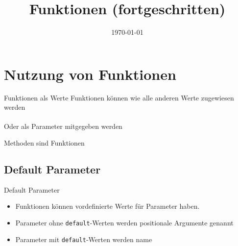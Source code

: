 

\newcommand{\topic}{
	Funktionen (fortgeschritten)
}

\title{\topic}
\supertitle{\course}
\date{\today}



\maketitle

\begin{frame}
	\tableofcontents
\end{frame}


\section{Nutzung von Funktionen}
\begin{frame}[fragile]{Funktionen als Werte}
  Funktionen k\"onnen wie alle anderen Werte zugewiesen werden\\
  

  \ \\[.25cm]
  Oder als Parameter mitgegeben werden\\
  
\end{frame}

\begin{frame}[fragile]{Methoden sind Funktionen}
  
\end{frame}


\subsection{Default Parameter}
\begin{frame}[fragile]{Default Parameter}
  \begin{itemize}
  	\item Funktionen k\"onnen vordefinierte Werte für Parameter haben.
  	\item Parameter ohne \texttt{default}-Werten werden positionale Argumente genannt
  	\item Parameter mit \texttt{default}-Werten werden name
  \end{itemize}
  
\end{frame}

